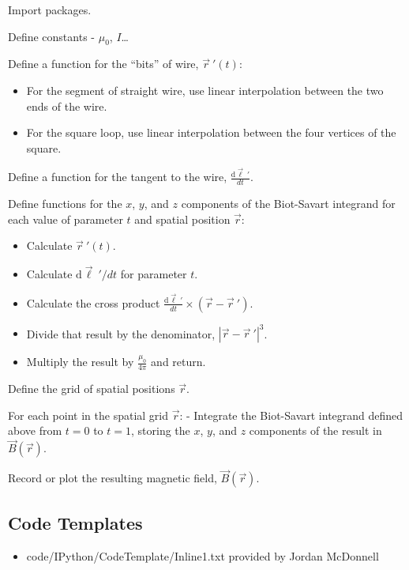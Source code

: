 \documentclass[]{article}
\providecommand{\tightlist}{%
  \setlength{\itemsep}{0pt}\setlength{\parskip}{0pt}}
\begin{document}
Import packages.

Define constants - \(\mu_0\), \(I\)\ldots{}

Define a function for the ``bits'' of wire, \(\vec{r}\ ' (t)\):

\begin{itemize}
\tightlist
\item
  For the segment of straight wire, use linear interpolation between the
  two ends of the wire.
\item
  For the square loop, use linear interpolation between the four
  vertices of the square.
\end{itemize}

Define a function for the tangent to the wire,
\(\frac{\mathrm{d}\vec{\ell}\ ' }{dt}\).

Define functions for the \(x\), \(y\), and \(z\) components of the
Biot-Savart integrand for each value of parameter \(t\) and spatial
position \(\vec{r}\):

\begin{itemize}
\tightlist
\item
  Calculate \(\vec{r}\ ' (t)\).
\item
  Calculate \(\mathrm{d}\vec{\ell}\ ' /dt\) for parameter \(t\).
\item
  Calculate the cross product
  \(\frac{\mathrm{d}\vec{\ell}\ ' }{dt} \times \left( \vec{r}- \vec{r}\ ' \right)\).
\item
  Divide that result by the denominator,
  \(\left\vert \vec{r}- \vec{r}\ ' \right\vert^3\).
\item
  Multiply the result by \(\frac{\mu_0}{4\pi}\) and return.
\end{itemize}

Define the grid of spatial positions \(\vec{r}\).

For each point in the spatial grid \(\vec{r}\): - Integrate the
Biot-Savart integrand defined above from \(t=0\) to \(t=1\), storing the
\(x\), \(y\), and \(z\) components of the result in
\(\vec{B}(\vec{r})\).

Record or plot the resulting magnetic field, \(\vec{B}(\vec{r})\).

\subsection{Code Templates}\label{code-templates}

\begin{itemize}
\tightlist
\item
  code/IPython/CodeTemplate/Inline1.txt provided by Jordan McDonnell
\end{itemize}
\end{document}
